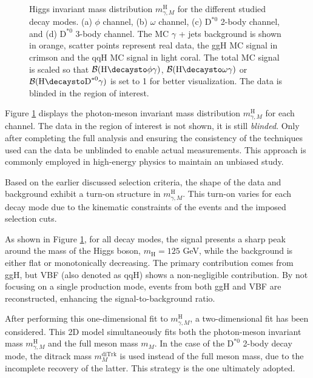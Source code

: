 \begin{figure}[!ht]
\caption{Higgs invariant mass distribution $m^{\text{H}}_{\gamma, M}$ for the different studied decay modes. (a) $\phi$ channel, (b) $\omega$ channel, (c) $\text{D}^{*0}$ 2-body channel, and (d) $\text{D}^{*0}$ 3-body channel. The MC $\gamma$ + jets background is shown in orange, scatter points represent real data, the ggH MC signal in crimson and the qqH MC signal in light coral. The total MC signal is scaled so that $\mathcal{B}(\text{H}\protect\decaysto \phi\gamma)$, $\mathcal{B}(\text{H}\protect\decaysto \omega\gamma)$ or $\mathcal{B}(\text{H}\protect\decaysto \text{D}^{*0}\gamma)$ is set to 1 for better visualization. The data is blinded in the region of interest.}
\label{fig:Higgs_mass_data}
    \vspace*{-0.0cm}
\end{figure}
Figure \ref{fig:Higgs_mass_data} displays the photon-meson invariant mass distribution $m^{\text{H}}_{\gamma, M}$ for each channel. The data in the region of interest is not shown, it is still \textit{blinded}. Only after completing the full analysis and ensuring the consistency of the techniques used can the data be unblinded to enable actual measurements. This approach is commonly employed in high-energy physics to maintain an unbiased study.

Based on the earlier discussed selection criteria, the shape of the data and background exhibit a turn-on structure in $m^{\text{H}}_{\gamma, M}$. This turn-on varies for each decay mode due to the kinematic constraints of the events and the imposed selection cuts.

As shown in Figure \ref{fig:Higgs_mass_data}, for all decay modes, the signal presents a sharp peak around the mass of the Higgs boson, $m_{\text{H}}=125$ GeV, while the background is either flat or monotonically decreasing. The primary contribution comes from ggH, but VBF (also denoted as qqH) shows a non-negligible contribution. By not focusing on a single production mode, events from both ggH and VBF are reconstructed, enhancing the signal-to-background ratio.

After performing this one-dimensional fit to $m^{\text{H}}_{\gamma, M}$, a two-dimensional fit has been considered. This 2D model simultaneously fits both the photon-meson invariant mass $m^{\text{H}}_{\gamma, M}$ and the full meson mass $m_{M}$. In the case of the $\text{D}^{*0}$ 2-body decay mode, the ditrack mass $m^{\text{diTrk}}_{M}$ is used instead of the full meson mass, due to the incomplete recovery of the latter. This strategy is the one ultimately adopted.

